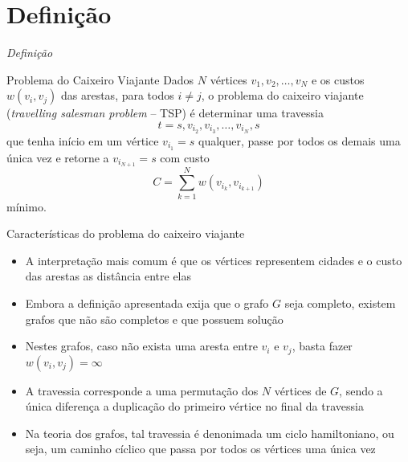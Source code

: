 \section{Definição}

\begin{frame}[fragile]{{\it Definição}}

    \begin{block}{Problema do Caixeiro Viajante}
        Dados $N$ vértices $v_1, v_2, \ldots, v_N$ e os custos $w(v_i, v_j)$ das arestas, para 
        todos $i\neq j$, o problema do caixeiro viajante (\textit{travelling salesman problem} --
        TSP) é determinar uma travessia
        \[
            t = s, v_{i_2}, v_{i_3}, \ldots, v_{i_{N}}, s
        \]
        que tenha início em um vértice $v_{i_1} = s$ qualquer, passe por todos os demais uma única vez e retorne
        a $v_{i_{N +1}} = s$ com custo 
        \[
            C = \sum_{k = 1}^N w(v_{i_k}, v_{i_{k + 1}})
        \]
        mínimo.
    \end{block}

\end{frame}

\begin{frame}[fragile]{Características do problema do caixeiro viajante}

    \begin{itemize}
        \item A interpretação mais comum é que os vértices representem cidades e o custo das
            arestas as distância entre elas

        \item Embora a definição apresentada exija que o grafo $G$ seja completo, existem
            grafos que não são completos e que possuem solução

        \item Nestes grafos, caso não exista uma aresta entre $v_i$ e $v_j$, basta fazer 
            $w(v_i, v_j) = \infty$

        \item A travessia corresponde a uma permutação dos $N$ vértices de $G$, sendo a única
            diferença a duplicação do primeiro vértice no final da travessia

        \item Na teoria dos grafos, tal travessia é denonimada um ciclo hamiltoniano, ou seja,
            um caminho cíclico que passa por todos os vértices uma única vez

    \end{itemize}

\end{frame}
